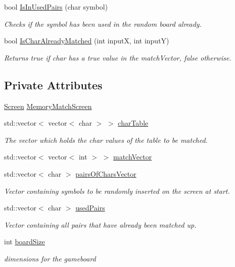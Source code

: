 \begin{DoxyCompactItemize}
bool \hyperlink{classMemoryMatch_a7f3998ff0f59a063a493156c2d00eca2}{Is\-In\-Used\-Pairs} (char symbol)
\begin{DoxyCompactList}\small\item\em Checks if the symbol has been used in the random board already. \end{DoxyCompactList}\item 
bool \hyperlink{classMemoryMatch_acf4047dc2a34d4045a6a240253cb5600}{Is\-Char\-Already\-Matched} (int input\-X, int input\-Y)
\begin{DoxyCompactList}\small\item\em Returns true if char has a true value in the match\-Vector, false otherwise. \end{DoxyCompactList}\end{DoxyCompactItemize}
\subsection*{Private Attributes}
\begin{DoxyCompactItemize}
\item 
\hyperlink{classScreen}{Screen} \hyperlink{classMemoryMatch_a78399975fec5fea7b2102449a4536fcd}{Memory\-Match\-Screen}
\item 
std\-::vector$<$ vector$<$ char $>$ $>$ \hyperlink{classMemoryMatch_af2437cf6ce06147e64feb7dca23715e7}{char\-Table}
\begin{DoxyCompactList}\small\item\em The vector which holds the char values of the table to be matched. \end{DoxyCompactList}\item 
std\-::vector$<$ vector$<$ int $>$ $>$ \hyperlink{classMemoryMatch_a87ee5474b348c72d91a359e1bbbe2e10}{match\-Vector}
\item 
std\-::vector$<$ char $>$ \hyperlink{classMemoryMatch_a80336b0b989152fed590a6fa755197bc}{pairs\-Of\-Chars\-Vector}
\begin{DoxyCompactList}\small\item\em Vector containing symbols to be randomly inserted on the screen at start. \end{DoxyCompactList}\item 
std\-::vector$<$ char $>$ \hyperlink{classMemoryMatch_adcb66679aaceb1414fe023d065863d2f}{used\-Pairs}
\begin{DoxyCompactList}\small\item\em Vector containing all pairs that have already been matched up. \end{DoxyCompactList}\item 
int \hyperlink{classMemoryMatch_aae0a9e51558d70e671fa64aa246de499}{board\-Size}
\begin{DoxyCompactList}\small\item\em dimensions for the gameboard \end{DoxyCompactList}\end{DoxyCompactItemize}
